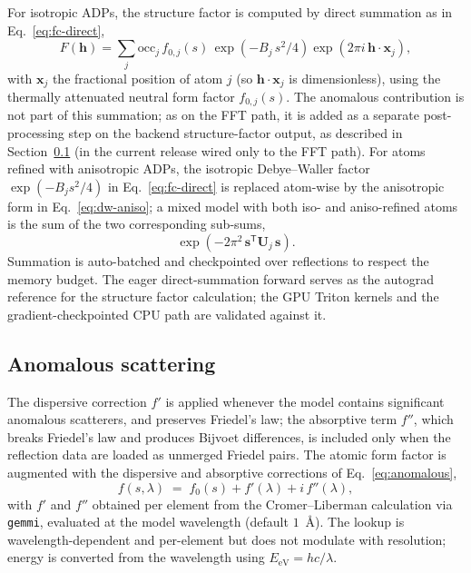 \documentclass{iucrjournals}
\begin{document}
For isotropic ADPs, the structure factor is computed by direct summation as
in Eq.~\ref{eq:fc-direct},
%
\begin{equation}
  F(\mathbf{h}) = \sum_{j} \mathrm{occ}_{j}\, f_{0,j}(s)\,
  \exp\!\left(-B_{j}\, s^{2}/4\right)
  \exp\!\left(2\pi i\,\mathbf{h}\cdot\mathbf{x}_{j}\right),
  \label{eq:fc-direct}
\end{equation}
%
with $\mathbf{x}_{j}$ the fractional position of atom $j$ (so
$\mathbf{h}\cdot\mathbf{x}_{j}$ is dimensionless), using the thermally
attenuated neutral form factor $f_{0,j}(s)$. The anomalous contribution is
not part of this summation; as on the FFT path, it is added as a separate
post-processing step on the backend structure-factor output, as described in
Section~\ref{sec:anomalous} (in the current release wired only to the FFT
path). For atoms refined with anisotropic ADPs, the
isotropic Debye--Waller factor $\exp(-B_{j}s^{2}/4)$ in
Eq.~\ref{eq:fc-direct} is replaced atom-wise by the anisotropic form
in Eq.~\ref{eq:dw-aniso}; a mixed model with both iso- and aniso-refined
atoms is the sum of the two corresponding sub-sums,
%
\begin{equation}
  \exp\!\left(-2\pi^{2}\,\mathbf{s}^{\mathsf{T}}\mathbf{U}_{j}\,\mathbf{s}\right).
  \label{eq:dw-aniso}
\end{equation}
%
Summation is auto-batched and checkpointed over reflections to respect the
memory budget.  The eager direct-summation forward serves as the autograd
reference for the structure factor calculation; the GPU Triton kernels and
the gradient-checkpointed CPU path are validated against it.

\subsection{Anomalous scattering}\label{sec:anomalous}

The dispersive correction $f'$ is applied whenever the model contains
significant anomalous scatterers, and preserves Friedel's law; the absorptive
term $f''$, which breaks Friedel's law and produces Bijvoet differences, is
included only when the reflection data are loaded as unmerged Friedel pairs.
The atomic form factor is augmented with the dispersive and absorptive
corrections of Eq.~\ref{eq:anomalous},
%
\begin{equation}
  f(s, \lambda) \;=\; f_{0}(s) + f'(\lambda) + i\,f''(\lambda),
  \label{eq:anomalous}
\end{equation}
%
with $f'$ and $f''$ obtained per element from the Cromer--Liberman
calculation \cite{cromer_anomalous_1981} via \texttt{gemmi}, evaluated at the
model wavelength (default $1$~\AA{}).  The lookup is wavelength-dependent and
per-element but does not modulate with resolution; energy is converted from the
wavelength using $E_\mathrm{eV} = hc / \lambda$.
\end{document}
